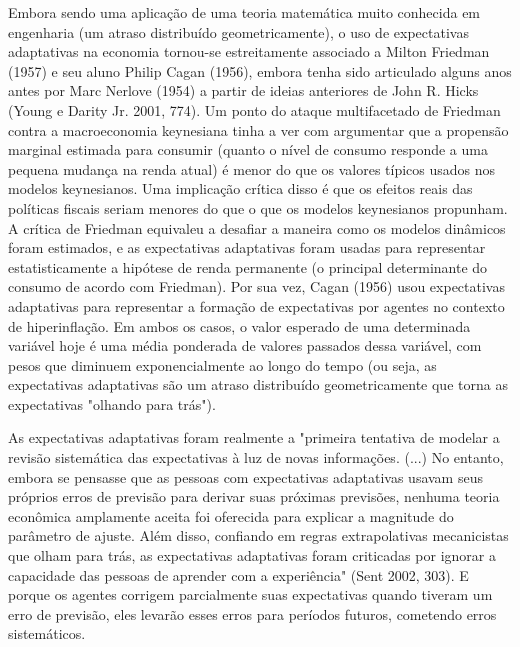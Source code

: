 \documentclass[a4paper,12pt]{article}[abntex2]
\begin{document}
Embora sendo uma aplicação de uma teoria matemática muito conhecida em engenharia (um atraso distribuído geometricamente), o uso de expectativas adaptativas na economia tornou-se estreitamente associado a Milton Friedman (1957) e seu aluno Philip Cagan (1956), embora tenha sido articulado alguns anos antes por Marc Nerlove (1954) a partir de ideias anteriores de John R. Hicks (Young e Darity Jr. 2001, 774). Um ponto do ataque multifacetado de Friedman contra a macroeconomia keynesiana tinha a ver com argumentar que a propensão marginal estimada para consumir (quanto o nível de consumo responde a uma pequena mudança na renda atual) é menor do que os valores típicos usados nos modelos keynesianos. Uma implicação crítica disso é que os efeitos reais das políticas fiscais seriam menores do que o que os modelos keynesianos propunham. A crítica de Friedman equivaleu a desafiar a maneira como os modelos dinâmicos foram estimados, e as expectativas adaptativas foram usadas para representar estatisticamente a hipótese de renda permanente (o principal determinante do consumo de acordo com Friedman). Por sua vez, Cagan (1956) usou expectativas adaptativas para representar a formação de expectativas por agentes no contexto de hiperinflação. Em ambos os casos, o valor esperado de uma determinada variável hoje é uma média ponderada de valores passados dessa variável, com pesos que diminuem exponencialmente ao longo do tempo (ou seja, as expectativas adaptativas são um atraso distribuído geometricamente que torna as expectativas "olhando para trás").

As expectativas adaptativas foram realmente a "primeira tentativa de modelar a revisão sistemática das expectativas à luz de novas informações. (...) No entanto, embora se pensasse que as pessoas com expectativas adaptativas usavam seus próprios erros de previsão para derivar suas próximas previsões, nenhuma teoria econômica amplamente aceita foi oferecida para explicar a magnitude do parâmetro de ajuste. Além disso, confiando em regras extrapolativas mecanicistas que olham para trás, as expectativas adaptativas foram criticadas por ignorar a capacidade das pessoas de aprender com a experiência" (Sent 2002, 303). E porque os agentes corrigem parcialmente suas expectativas quando tiveram um erro de previsão, eles levarão esses erros para períodos futuros, cometendo erros sistemáticos.
\end{document}

